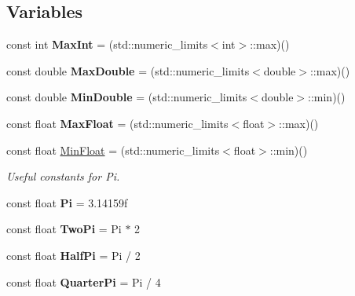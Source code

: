 \subsection*{Variables}
\begin{DoxyCompactItemize}
\item 
\hypertarget{namespacesteer_ac2c05a7a66233029823a2cacbd3f9f12}{const int {\bfseries Max\-Int} = (std\-::numeric\-\_\-limits$<$int$>$\-::max)()}\label{namespacesteer_ac2c05a7a66233029823a2cacbd3f9f12}

\item 
\hypertarget{namespacesteer_a45300e8fbea49b9bc5b7be6f21c15c7b}{const double {\bfseries Max\-Double} = (std\-::numeric\-\_\-limits$<$double$>$\-::max)()}\label{namespacesteer_a45300e8fbea49b9bc5b7be6f21c15c7b}

\item 
\hypertarget{namespacesteer_a517505ea56a449259f2cc542e417ce93}{const double {\bfseries Min\-Double} = (std\-::numeric\-\_\-limits$<$double$>$\-::min)()}\label{namespacesteer_a517505ea56a449259f2cc542e417ce93}

\item 
\hypertarget{namespacesteer_add0e6174813ace40bbb9cb98f0e3c5d7}{const float {\bfseries Max\-Float} = (std\-::numeric\-\_\-limits$<$float$>$\-::max)()}\label{namespacesteer_add0e6174813ace40bbb9cb98f0e3c5d7}

\item 
\hypertarget{namespacesteer_a96bf68d321f262da821a26567f563f5d}{const float \hyperlink{namespacesteer_a96bf68d321f262da821a26567f563f5d}{Min\-Float} = (std\-::numeric\-\_\-limits$<$float$>$\-::min)()}\label{namespacesteer_a96bf68d321f262da821a26567f563f5d}

\begin{DoxyCompactList}\small\item\em Useful constants for Pi. \end{DoxyCompactList}\item 
\hypertarget{namespacesteer_a9ede252c728122c7e62eae19b4137e3a}{const float {\bfseries Pi} = 3.\-14159f}\label{namespacesteer_a9ede252c728122c7e62eae19b4137e3a}

\item 
\hypertarget{namespacesteer_a78bcc0c0f0548d243c333a6e8e086242}{const float {\bfseries Two\-Pi} = Pi $\ast$ 2}\label{namespacesteer_a78bcc0c0f0548d243c333a6e8e086242}

\item 
\hypertarget{namespacesteer_a96d81a14fa90c76872f3af149cdd97ef}{const float {\bfseries Half\-Pi} = Pi / 2}\label{namespacesteer_a96d81a14fa90c76872f3af149cdd97ef}

\item 
\hypertarget{namespacesteer_aadcf7f03bead45c81e0c67bc10c49acb}{const float {\bfseries Quarter\-Pi} = Pi / 4}\label{namespacesteer_aadcf7f03bead45c81e0c67bc10c49acb}

\end{DoxyCompactItemize}


